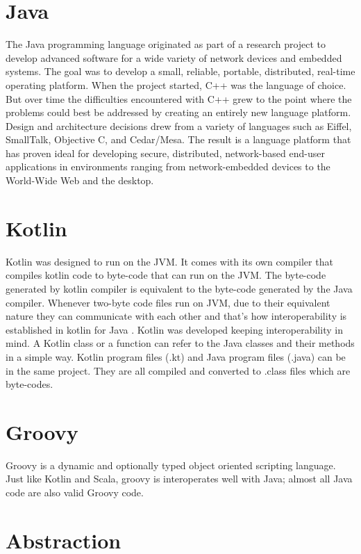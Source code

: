 \documentclass[12pt]{book}
\begin{document}
\section{Java}
The Java programming language originated as part of a research project to develop advanced software for a wide variety of network devices and embedded systems. The goal was to develop a small, reliable, portable, distributed, real-time operating platform. When the project started, C++ was the language of choice. But over time the difficulties encountered with C++ grew to the point where the problems could best be addressed by creating an entirely new language platform. Design and architecture decisions drew from a variety of languages such as Eiffel, SmallTalk, Objective C, and Cedar/Mesa. The result is a language platform that has proven ideal for developing secure, distributed, network-based end-user applications in environments ranging from network-embedded devices to the World-Wide Web and the desktop. 

\section{Kotlin}
Kotlin was designed to run on the JVM. It comes with its own compiler that compiles kotlin code to byte-code that can run on the JVM. The byte-code generated by kotlin compiler is equivalent to the byte-code generated by the Java compiler. Whenever two-byte code files run on JVM, due to their equivalent nature they can communicate with each other and that’s how interoperability is established in kotlin for Java . Kotlin was developed keeping interoperability in mind. A Kotlin class or a function can refer to the Java classes and their methods in a simple way. Kotlin program files (.kt) and Java program files (.java) can be in the same project. They are all compiled and converted to .class files which are byte-codes.

\section{Groovy}
Groovy is a dynamic and optionally typed object oriented scripting language. Just like Kotlin and Scala, groovy is interoperates well with Java; almost all Java code are also valid Groovy code.

\section{Abstraction}
\end{document}
